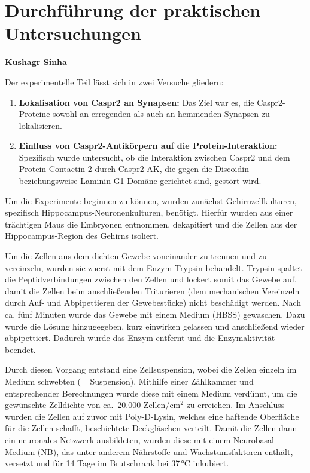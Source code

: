 \chapter{Durchführung der praktischen Untersuchungen}
\textbf{Kushagr Sinha}


Der experimentelle Teil lässt sich in zwei Versuche gliedern:

\begin{enumerate}
	\item \textbf{Lokalisation von Caspr2 an Synapsen:} Das Ziel war es,
	die Caspr2-Proteine sowohl an erregenden als auch an
	hemmenden Synapsen zu lokalisieren.
	\item \textbf{Einfluss von Caspr2-Antikörpern auf die
		Protein-Interaktion:} Spezifisch wurde untersucht, ob die Interaktion zwischen Caspr2 und dem Protein Contactin-2 durch Caspr2-AK, die gegen die Discoidin- beziehungsweise Laminin-G1-Domäne gerichtet sind, gestört wird.
\end{enumerate}

Um die Experimente beginnen zu können, wurden zunächst
Gehirnzellkulturen, spezifisch Hippocampus-Neuronenkulturen, benötigt. Hierfür
wurden aus einer trächtigen Maus die Embryonen entnommen, dekapitiert
und die Zellen aus der \\Hippocampus-Region des Gehirns isoliert.

Um die Zellen aus dem dichten Gewebe voneinander zu trennen und zu vereinzeln, wurden sie zuerst mit dem Enzym Trypsin behandelt. Trypsin spaltet die Peptidverbindungen zwischen den Zellen und lockert somit das Gewebe auf, damit die Zellen beim anschließenden Triturieren (dem mechanischen Vereinzeln durch Auf- und Abpipettieren der Gewebestücke) nicht beschädigt werden. Nach ca. fünf Minuten wurde das Gewebe mit einem Medium (HBSS) gewaschen. Dazu wurde die Lösung hinzugegeben, kurz einwirken gelassen und anschließend wieder abpipettiert. Dadurch wurde das Enzym entfernt und die Enzymaktivität beendet.

Durch diesen Vorgang entstand eine Zellsuspension, wobei die Zellen einzeln im Medium schwebten (= Suspension). Mithilfe einer Zählkammer und entsprechender Berechnungen wurde diese mit einem Medium verdünnt, um die gewünschte Zelldichte von ca.\ 20.000 Zellen/cm$^2$ zu erreichen. Im Anschluss wurden die Zellen auf zuvor mit Poly-D-Lysin, welches eine haftende Oberfläche für die Zellen schafft, beschichtete Deckgläschen verteilt. Damit die Zellen dann ein neuronales Netzwerk ausbildeten, wurden diese mit einem Neurobasal-Medium (NB), das unter anderem Nährstoffe und Wachstumsfaktoren enthält, versetzt und für 14 Tage im Brutschrank bei 37\,°C inkubiert. 

